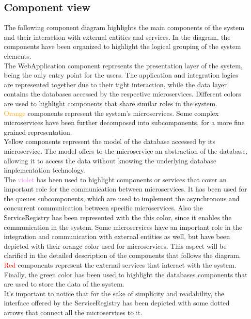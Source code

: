 \subsection{Component view}
The following component diagram highlights the main components of the system and their interaction with external entities and services. In the diagram, the components have 
been organized to highlight the logical grouping of the system elements.\\The WebApplication component represents the presentation layer of the system, being the only entry point for the users.
The application and integration logics are represented together due to their tight interaction, while the data layer contains the databases accessed by the respective microservices.
Different colors are used to highlight components that share similar roles in the system.\\ \textcolor{orange}{Orange} components represent the system's microservices. Some complex microservices have been further decomposed into subcomponents, for a more fine grained representation.\\
\textcolor{myyellow}{Yellow} components represent the model of the database accessed by its microservice. The model offers to the microservice an abstraction of the database, allowing it to access the data without knowing the underlying database implementation technology.\\ 
The \textcolor{violet}{violet} has been used to highlight components or services that cover an important role for the communication between microservices. It has been used for the queues subcomponents, which are used to implement the asynchronous and concurrent communication between specific microservices.
Also the ServiceRegistry has been represented with the this color, since it enables the communication in the system.
Some microservices have an important role in the integration and communication with external entities as well, but have been depicted with their orange color used for microservices. This aspect will be clarified in the detailed description of the components that follows the diagram.\\
\textcolor{red}{Red} components represent the external services that interact with the system.\\
Finally, the \textcolor{mygreen}{green} color has been used to highlight the databases components that are used to store the data of the system.\\
It's important to notice that for the sake of simplicity and readability, the interface offered by the ServiceRegistry has been depicted with some dotted arrows that connect all the microservices to it.

